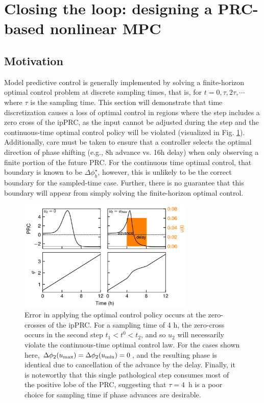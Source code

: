 \section{Closing the loop: designing a PRC-based nonlinear MPC\label{sec:fb}}



\subsection*{Motivation}
Model predictive control is generally implemented by solving a finite-horizon optimal control problem at discrete sampling times, that is, for $t=0,\tau,2\tau,\cdots$ where $\tau$ is the sampling time.
This section will demonstrate that time discretization causes a loss of optimal control in regions where the step includes a zero cross of the ipPRC, as the input cannot be adjusted during the step and the continuous-time optimal control policy will be violated (visualized in Fig. \ref{fig:zerocross}).
Additionally, care must be taken to ensure that a controller selects the optimal direction of phase shifting (e.g., 8h advance vs. 16h delay) when only observing a finite portion of the future PRC.
For the continuous time optimal control, that boundary is known to be $\Delta\phi^\star_b$, however, this is unlikely to be the correct boundary for the sampled-time case.
Further, there is no guarantee that this boundary will appear from simply solving the finite-horizon optimal control.

\begin{figure}[p]
    \begin{center}
    \includegraphics[width=8.4cm]{chap6/figures/figure_3.png}
\end{center}
    \caption{\label{fig:zerocross} Error in applying the optimal control policy occurs at the zero-crosses of the ipPRC. For a sampling time of 4 h, the zero-cross occurs in the second step $t_1<t^0<t_2$, and so $u_2$ will necessarily violate the continuous-time optimal control law. For the cases shown here, $\Delta\phi_2(u_{\rm max}) = \Delta\phi_2(u_{\rm min}) = 0$, and the resulting phase is identical due to cancellation of the advance by the delay. Finally, it is noteworthy that this single pathological step consumes most of the positive lobe of the PRC, suggesting that $\tau=4$~h is a poor choice for sampling time if phase advances are desirable.}
\end{figure}

